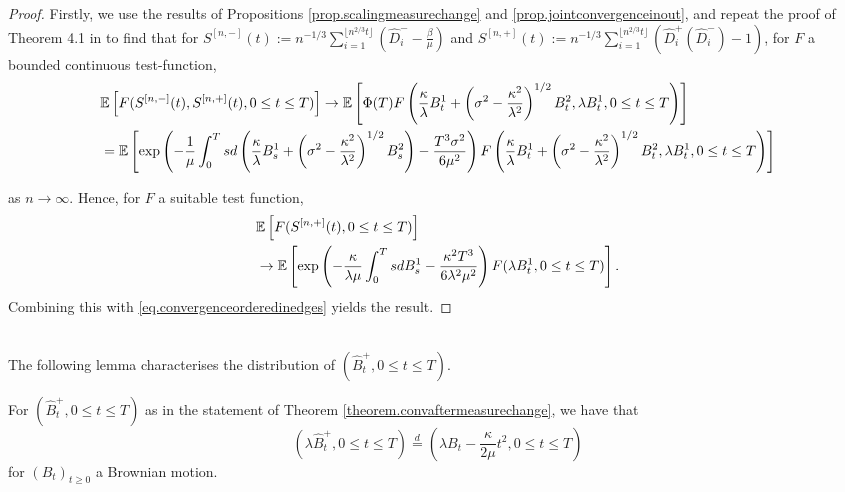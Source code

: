 \begin{proof}
 Firstly, we use the results of Propositions \ref{prop.scalingmeasurechange} and \ref{prop.jointconvergenceinout}, and repeat the proof of Theorem 4.1 in \cite{Conchon2018} to find that for ${S}^{[n,-]}(t):=n^{-1/3}\sum_{i=1}^{\lfloor n^{2/3}t\rfloor} \left(\hat{D}^-_i-\frac{\beta}{\mu}\right) $ and ${S}^{[n,+]}(t):=n^{-1/3}\sum_{i=1}^{\lfloor  n^{2/3}t \rfloor} \left(\hat{D}^+_i(\hat{D}^-_i)-1\right)$, for $F$ a bounded continuous test-function,
 \begin{align*}&\E\left[F({S}^{[n,-]}(t),{S}^{[n,+]}(t), 0\leq t \leq T ) \right] \to \E\left[\Phi(T) F\left(\frac{\kappa}{\lambda}B_t^1+\left(\sigma^2-\frac{\kappa^2}{\lambda^2}\right)^{1/2}B_t^2   ,\lambda B_t^1, 0\leq t \leq T\right)\right]\\
 &= \E\left[\exp\left(-\frac{1}{\mu}\int_0^Tsd\left(\frac{\kappa}{\lambda}B_s^1+\left(\sigma^2-\frac{\kappa^2}{\lambda^2}\right)^{1/2}B_s^2\right) - \frac{T^3 \sigma^2}{6\mu^2}\right) F\left(\frac{\kappa}{\lambda}B_t^1+\left(\sigma^2-\frac{\kappa^2}{\lambda^2}\right)^{1/2}B_t^2   ,\lambda B_t^1, 0\leq t \leq T\right)\right]\end{align*}
 
 as $n\to \infty$. Hence, for $F$ a suitable test function, 
 \begin{align*}&\E\left[F({S}^{[n,+]}(t), 0\leq t \leq T ) \right]\\&\to \E\left[\exp\left(-\frac{\kappa}{\lambda \mu} \int_0^T s dB^1_s -\frac{\kappa^2 T^3}{6\lambda^2 \mu^2}\right)F(\lambda B^1_t,   0\leq t \leq T)\right].\end{align*}
 Combining this with \eqref{eq.convergenceorderedinedges} yields the result.
 \end{proof}\\
 The following lemma characterises the distribution of $(\hat{B}^+_t, {0\leq t\leq T})$.
 \begin{lemma}\label{lemma.characterizelimitprocess}
 For $(\hat{B}^+_t, {0\leq t\leq T})$ as in the statement of Theorem \ref{theorem.convaftermeasurechange}, we have that 
 $$(\lambda \hat{B}^+_t, {0\leq t\leq T})\overset{d}{=}\left(\lambda B_t-\frac{\kappa}{2\mu}t^2, {0\leq t\leq T}\right)$$
 for $(B_t)_{t\geq 0}$ a Brownian motion.
 \end{lemma}
